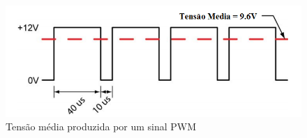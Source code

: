 \begin{figure}[h]
	\centering
	\includegraphics[width=1\textwidth]{figuras/pwm_tensao_media.png}
	\caption{Tensão média produzida por um sinal PWM}
	\label{fig:avervoltagepwm}
\end{figure}


